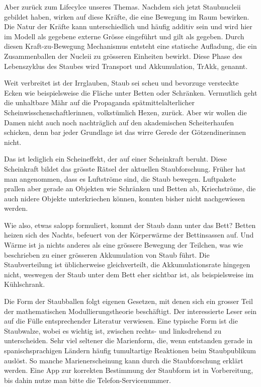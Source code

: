 Aber zurück zum Lifecylce unseres Themas. Nachdem sich jetzt Staubnucleii gebildet haben, wirken auf diese Kräfte, die eine Bewegung im Raum bewirken. Die Natur der Kräfte kann unterschiedlich und häufig additiv sein und wird hier im Modell als gegebene externe Grösse eingeführt und gilt als gegeben. Durch diesen Kraft-zu-Bewegung Mechanismus entsteht eine statische Aufladung, die ein Zusammenballen der Nucleii zu grösseren Einheiten bewirkt. Diese Phase des Lebenszyklus des Staubes wird Transport und Akkumulation, TrAkk, genannt. 

Weit verbreitet ist der Irrglauben, Staub sei scheu und bevorzuge versteckte Ecken wie beispielsweise die Fläche unter Betten oder Schränken. Vermutlich geht die unhaltbare Mähr auf die Propaganda spätmittelalterlicher Scheinwisschenschaftlerinnen, volkstümlich Hexen, zurück. Aber wir wollen die Damen nicht auch noch nachträglich auf den akademischen Scheiterhaufen schicken, denn bar jeder Grundlage ist das wirre Gerede der Götzendinerinnen nicht. 







Das ist lediglich ein Scheineffekt, der auf einer Scheinkraft beruht. Diese Scheinkraft bildet das grösste Rätsel der aktuellen Staubforschung. Früher hat man angenommen, dass es Luftströme sind, die Staub bewegen. Luftpakete prallen aber gerade an Objekten wie Schränken und Betten ab, Kriechströme, die auch nidere Objekte unterkriechen können, konnten bisher nicht nachgewiesen werden.

Wie also, etwas salopp formuliert, kommt der Staub dann unter das Bett? Betten heizen sich des Nachts, befeuert von der Körperwärme der Bettinsassen auf. Und Wärme ist ja nichts anderes als eine grössere Bewegung der Teilchen, was wie beschrieben zu einer grösseren Akkumulation von Staub führt. Die Staubverteilung ist üblicherweise gleichverteilt, die Akkumulationsrate hingegen nicht, weswegen der Staub unter dem Bett eher sichtbar ist, als beispielsweise im Kühlschrank.

Die Form der Staubballen folgt eigenen Gesetzen, mit denen sich ein grosser Teil der mathematischen Modullierungstheorie beschäftigt. Der interessierte Leser sein auf die Fülle entsprechender Literatur verwiesen. Eine typische Form ist die Staubwalze, wobei es wichtig ist, zwischen rechts- und linksdrehend zu unterscheiden. Sehr viel seltener die Marienform, die, wenn entstanden gerade in spanischsprachigen Ländern häufig tumultartige Reaktionen beim Staubpublikum auslöst. So manche Marienerscheinung kann durch die Staubforschung erklärt werden. Eine App zur korrekten Bestimmung der Staubform ist in Vorbereitung, bis dahin nutze man bitte die Telefon-Servicenummer.

